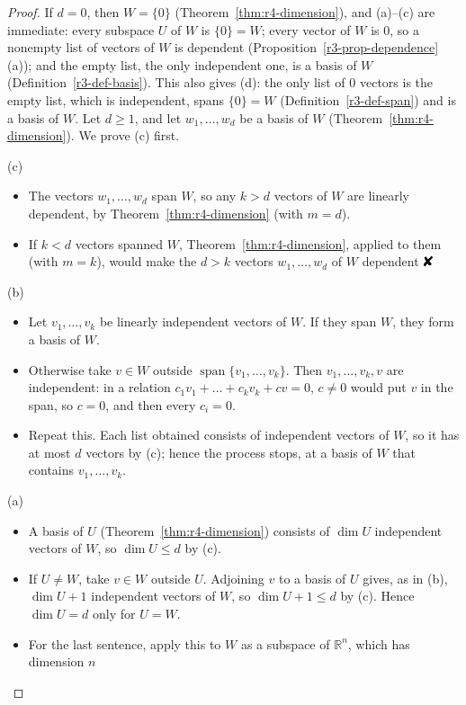 \documentclass[12pt]{article}
\newcommand{\R}{\mathbb R}
\newcommand{\contradiction}{\mathord{\text{\large\ding{56}}}}
\DeclareMathOperator{\Span}{span}
\theoremstyle{definition}
\begin{document}
\begin{proof}
If \(d=0\), then \(W=\{0\}\) (Theorem~\ref{thm:r4-dimension}), and (a)--(c) are immediate: every subspace \(U\) of
\(W\) is \(\{0\}=W\); every vector of \(W\) is \(0\), so a nonempty list of vectors of \(W\) is dependent
(Proposition~\ref{r3-prop-dependence}(a)); and the empty list, the only independent one, is a basis of
\(W\) (Definition~\ref{r3-def-basis}). This also gives (d): the only list of \(0\) vectors is the empty
list, which is independent, spans \(\{0\}=W\) (Definition~\ref{r3-def-span}) and is a basis of \(W\). Let \(d\geqslant1\), and let \(w_1,\dots,w_d\) be a basis of \(W\)
(Theorem~\ref{thm:r4-dimension}). We prove (c) first.

(c)
\begin{itemize}
\item The vectors \(w_1,\dots,w_d\) span \(W\), so any \(k>d\) vectors of \(W\) are linearly dependent, by
Theorem~\ref{thm:r4-dimension} (with \(m=d\)).
\item If \(k<d\) vectors spanned \(W\), Theorem~\ref{thm:r4-dimension}, applied to them (with \(m=k\)), would make the
\(d>k\) vectors \(w_1,\dots,w_d\) of \(W\) dependent \(\contradiction\)
\end{itemize}
(b)
\begin{itemize}
\item Let \(v_1,\dots,v_k\) be linearly independent vectors of \(W\). If they span \(W\), they form a basis
of \(W\).
\item Otherwise take \(v\in W\) outside \(\Span\{v_1,\dots,v_k\}\). Then \(v_1,\dots,v_k,v\) are independent:
in a relation \(c_1v_1+\dots+c_kv_k+cv=0\), \(c\ne0\) would put \(v\) in the span, so \(c=0\), and then
every \(c_i=0\).
\item Repeat this. Each list obtained consists of independent vectors of \(W\), so it has at most \(d\)
vectors by (c); hence the process stops, at a basis of \(W\) that contains \(v_1,\dots,v_k\).
\end{itemize}
(a)
\begin{itemize}
\item A basis of \(U\) (Theorem~\ref{thm:r4-dimension}) consists of \(\dim U\) independent vectors of \(W\), so
\(\dim U\leqslant d\) by (c).
\item If \(U\ne W\), take \(v\in W\) outside \(U\). Adjoining \(v\) to a basis of \(U\) gives, as in (b),
\(\dim U+1\) independent vectors of \(W\), so \(\dim U+1\leqslant d\) by (c). Hence \(\dim U=d\) only for
\(U=W\).
\item For the last sentence, apply this to \(W\) as a subspace of \(\R^n\), which has dimension \(n\)

\end{itemize}
\end{proof}
\end{document}
